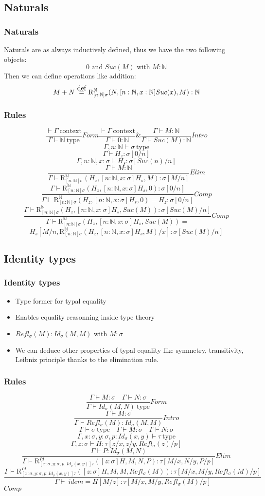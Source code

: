 \documentclass[aspectratio=169]{beamer}
\newcommand{\cntxt}{\ \mathrm{context}}
\newcommand{\typ}{\ \mathrm{type}}
\newcommand{\N}{\mathbb{N}}
\newcommand{\RN}[3]{\mathrm{R}_{[n: \N]\sigma}^{\N}(#1, #2, #3)}
\newcommand{\C}{Comp}
\newcommand{\Intro}{Intro}
\newcommand{\F}{Form}
\newcommand{\E}{Elim}
\newcommand\defeq{\stackrel{\mathclap{\normalfont\mbox{def}}}{\ =\ }}
\newcommand{\Id}[2]{Id_\sigma(#1,#2)}
\newcommand{\Refl}[1]{Refl_\sigma(#1)}
\newcommand{\RID}[4]{\mathrm{R}_{[x:\sigma,y:\sigma,p:Id_\sigma(x,y)]\tau}^{Id}(#1, #2, #3, #4)}
\newcommand{\bn}{[n:\N,x:\sigma]}
\newcommand{\bi}{[z:\sigma]}
\newcommand{\Gamdash}{\Gamma\vdash}
\begin{document}
    \subsection{Naturals}
    \begin{frame}
        \frametitle{Naturals}
        Naturals are as always inductively defined, thus we have the two following objects:
        $$0 \text{ and } Suc(M) \text{ with } M:\N$$
        \vspace{10pt}
        Then we can define operations like addition:
        $$M + N \defeq \RN{N}{[n:\N, x:\N]Suc(x)}{M}:\N$$
    \end{frame}
    \begin{frame}
        \frametitle{Rules}
        $$\frac{\vdash \Gamma \cntxt}{\Gamma \vdash \N \typ}\F \frac{\vdash \Gamma \cntxt}{\Gamma \vdash 0 : \N}\& \frac{\Gamma \vdash M : \N}{\Gamma \vdash Suc(M):\N}\Intro$$
        $$\Gamma,n:\N\vdash\sigma\typ$$
        $$\Gamdash H_z : \sigma[0/n]$$
        $$\Gamma,n:\N,x:\sigma\vdash H_s : \sigma[Suc(n)/n]$$
        $$\frac{\Gamdash M: \N}{\Gamdash\RN{H_z}{[n:\N,x:\sigma]H_s}{M}:\sigma[M/n]}\E$$
        $$\frac{\Gamma \vdash \RN{H_z}{\bn H_s}{0} : \sigma[0/n]}{\Gamma \vdash \RN{H_z}{\bn H_s}{0} = H_z: \sigma[0/n]}\C$$
        $$\frac{\Gamma \vdash \RN{H_z}{\bn H_s}{Suc(M)} : \sigma[Suc(M)/n]}{\Gamma \vdash \RN{H_z}{\bn H_s}{Suc(M)} =}\C$$
        $$ H_s[M/n,\RN{H_z}{\bn H_s}{M}/x]:\sigma[Suc(M)/n]$$
    \end{frame}
    \subsection{Identity types}
    \begin{frame}
        \frametitle{Identity types}
        \begin{itemize}
            \item Type former for typal equality
            \item Enables equality reasonning inside type theory
            \item $\Refl{M} : \Id{M}{M}$ with $M : \sigma$
            \item We can deduce other properties of typal equality like symmetry, transitivity, Leibniz principle thanks to the elimination rule.
        \end{itemize}
    \end{frame}
    \begin{frame}
        \frametitle{Rules}
        $$\frac{\Gamdash M:\sigma \quad \Gamdash N:\sigma}{\Gamma \vdash \Id{M}{N} \typ}\F$$
        $$\frac{\Gamdash M:\sigma}{\Gamdash\Refl{M}:\Id{M}{M}}\Intro$$
        $$\Gamdash\sigma\typ\quad\Gamdash M:\sigma\quad\Gamdash N:\sigma$$
        $$\Gamma, x:\sigma,y:\sigma,p:\Id{x}{y}\vdash\tau\typ$$
        $$\Gamma,z:\sigma\vdash H:\tau[z/x,z/y,\Refl{z}/p]$$
        $$\frac{\Gamdash P:\Id{M}{N}}{\Gamdash\RID{[z:\sigma]H}{M}{N}{P}:\tau[M/x,N/y,P/p]}\E$$
        $$\frac{\Gamma \vdash \RID{\bi H}{M}{M}{\Refl{M}}:\tau[M/x,M/y,\Refl{M}/p]}{\Gamma \vdash\ idem = H[M/z]:\tau[M/x,M/y,\Refl{M}/p]}$$$\C$
    \end{frame}
\end{document}
